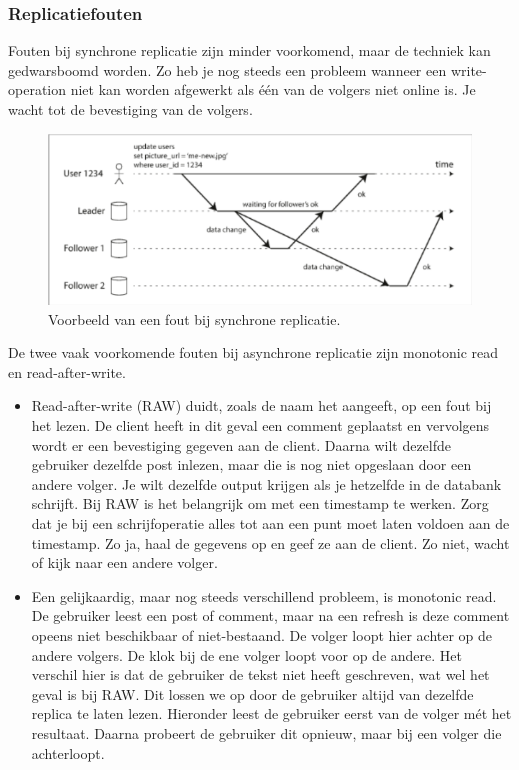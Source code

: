 \documentclass[a4paper,10pt,twoside]{report}
\begin{document}
\subsubsection{Replicatiefouten}

Fouten bij synchrone replicatie zijn minder voorkomend, maar de techniek kan gedwarsboomd worden. Zo heb je nog steeds een probleem wanneer een write-operation niet kan worden afgewerkt als één van de volgers niet online is. Je wacht tot de bevestiging van de volgers.

\begin{figure}
	\includegraphics[width=\linewidth]{../images/Screenshot_160.png}
	\caption{Voorbeeld van een fout bij synchrone replicatie.}
\end{figure}

De twee vaak voorkomende fouten bij asynchrone replicatie zijn monotonic read en read-after-write. 

\begin{itemize}
	\item Read-after-write (RAW) duidt, zoals de naam het aangeeft, op een fout bij het lezen. De client heeft in dit geval een comment geplaatst en vervolgens wordt er een bevestiging gegeven aan de client. Daarna wilt dezelfde gebruiker dezelfde post inlezen, maar die is nog niet opgeslaan door een andere volger. Je wilt dezelfde output krijgen als je hetzelfde in de databank schrijft. Bij RAW is het belangrijk om met een timestamp te werken. Zorg dat je bij een schrijfoperatie alles tot aan een punt moet laten voldoen aan de timestamp. Zo ja, haal de gegevens op en geef ze aan de client. Zo niet, wacht of kijk naar een andere volger.
	\item Een gelijkaardig, maar nog steeds verschillend probleem, is monotonic read. De gebruiker leest een post of comment, maar na een refresh is deze comment opeens niet beschikbaar of niet-bestaand. De volger loopt hier achter op de andere volgers. De klok bij de ene volger loopt voor op de andere. Het verschil hier is dat de gebruiker de tekst niet heeft geschreven, wat wel het geval is bij RAW. Dit lossen we op door de gebruiker altijd van dezelfde replica te laten lezen. Hieronder leest de gebruiker eerst van de volger mét het resultaat. Daarna probeert de gebruiker dit opnieuw, maar bij een volger die achterloopt.
\end{itemize}
\end{document}
